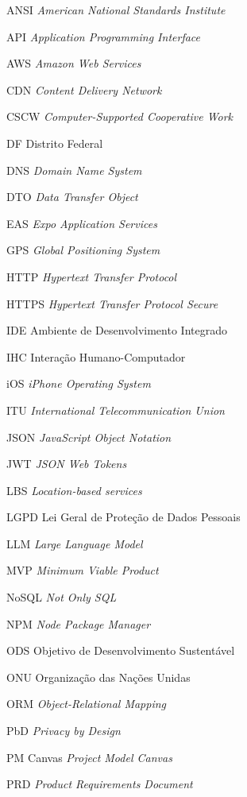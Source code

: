 \begin{siglas}
  \item[ANSI] \textit{American National Standards Institute}
  \item[API] \textit{Application Programming Interface}
  \item[AWS] \textit{Amazon Web Services}
  \item[CDN] \textit{Content Delivery Network}
  \item[CSCW] \textit{Computer-Supported Cooperative Work}
  \item[DF] Distrito Federal
  \item[DNS] \textit{Domain Name System}
  \item[DTO] \textit{Data Transfer Object}
  \item[EAS] \textit{Expo Application Services}
  \item[GPS] \textit{Global Positioning System}
  \item[HTTP] \textit{Hypertext Transfer Protocol}
  \item[HTTPS] \textit{Hypertext Transfer Protocol Secure}
  \item[IDE] Ambiente de Desenvolvimento Integrado
  \item[IHC] Interação Humano-Computador
  \item[iOS] \textit{iPhone Operating System}
  \item[ITU] \textit{International Telecommunication Union}
  \item[JSON] \textit{JavaScript Object Notation}
  \item[JWT] \textit{JSON Web Tokens}
  \item[LBS] \textit{Location-based services}
  \item[LGPD] Lei Geral de Proteção de Dados Pessoais
  \item[LLM] \textit{Large Language Model}
  \item[MVP] \textit{Minimum Viable Product}
  \item[NoSQL] \textit{Not Only SQL}
  \item[NPM] \textit{Node Package Manager}
  \item[ODS] Objetivo de Desenvolvimento Sustentável
  \item[ONU] Organização das Nações Unidas
  \item[ORM] \textit{Object-Relational Mapping}
  \item[PbD] \textit{Privacy by Design}
  \item[PM Canvas] \textit{Project Model Canvas}
  \item[PRD] \textit{Product Requirements Document}

\end{siglas}
